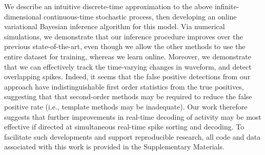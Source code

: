 We describe an intuitive discrete-time approximation to the above infinite-dimensional continuous-time stochastic process, %
then developing an online variational Bayesian inference algorithm for this model.  
Via numerical simulations, we demonstrate that our inference procedure improves over the previous state-of-the-art,
even though we allow the other methods to use the entire dataset for training, whereas we learn online.  
Moreover, we demonstrate that we can effectively track the time-varying changes in waveform, and detect overlapping spikes.  
Indeed, it seems that the false positive detections from our approach have indistinguishable first order statistics from the true positives, suggesting that that second-order methods may be required to reduce the false positive rate (i.e., template methods may be inadequate).  Our work therefore suggests that further improvements in real-time decoding of activity may be most effective if directed at simultaneous real-time spike sorting and decoding.  To facilitate such developments and support reproducible research, all code and data associated with this work is provided in the Supplementary Materials.


